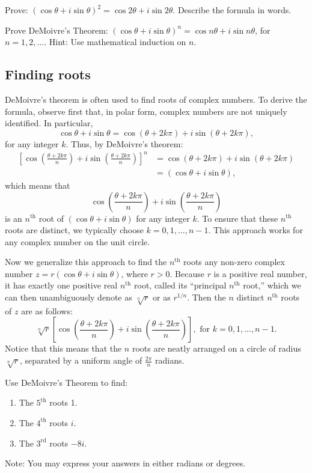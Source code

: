 \documentclass[handout,space,nooutcomes]{ximera}
\begin{document}
\begin{problem}
Prove:  $(\cos\theta + i\sin\theta)^2=\cos 2\theta + i\sin 2\theta$.  Describe the formula in words.    
\end{problem}

\begin{problem}
Prove DeMoivre's Theorem:  $(\cos\theta + i\sin\theta)^n=\cos n\theta + i\sin n\theta$, for $n=1, 2, \dots$.  Hint: Use mathematical induction on $n$. 
\end{problem}

\subsection*{Finding roots}
DeMoivre's theorem is often used to find roots of complex numbers.  
To derive the formula, observe first that, in polar form, complex numbers are not uniquely identified.  In particular, 
\[
\cos\theta + i\sin\theta =\cos (\theta+2k\pi) + i\sin (\theta+2k\pi), 
\]
for any integer $k$. Thus, by DeMoivre's theorem:  
\begin{align*}
\left[ \cos \left(\frac{\theta+2k\pi}{n}\right) 
+ i\sin \left(\frac{\theta+2k\pi}{n}\right) \right]^n 
&= \cos (\theta+2k\pi) + i\sin (\theta+2k\pi) \\
&= (\cos\theta + i\sin\theta), 
\end{align*}
which means that 
\[
\cos \left(\frac{\theta+2k\pi}{n}\right) 
+ i\sin \left(\frac{\theta+2k\pi}{n}\right)
\]
is an $n^\text{th}$ root of $(\cos\theta + i\sin\theta)$ for any integer $k$.  To ensure that these $n^\text{th}$ roots are distinct, we typically choose $k= 0, 1, \dots, n-1$.  This approach works for any complex number on the unit circle.  

Now we generalize this approach to find the $n^\text{th}$ roots any non-zero complex number $z=r(\cos\theta + i\sin\theta)$, where $r>0$.  Because $r$ is a positive real number, it has exactly one positive real $n^\text{th}$ root, called its ``principal $n^\text{th}$ root,'' which we can then unambiguously denote as $\sqrt[n]{r}$ or as $r^{1/n}$.  Then the $n$ distinct $n^\text{th}$ roots of $z$ are as follows: 
\[
\sqrt[n]{r}\left[\cos \left(\frac{\theta+2k\pi}{n}\right) 
+ i\sin \left(\frac{\theta+2k\pi}{n}\right)\right], \text{ for } k= 0, 1, \dots, n-1. 
\]
Notice that this means that the $n$ roots are neatly arranged on a circle of radius 
$\sqrt[n]{r}$, separated by a uniform angle of $\frac{2\pi}{n}$ radians.  

\begin{problem}
Use DeMoivre's Theorem to find: 
\begin{enumerate}
\item The $5^\text{th}$ roots 1.  
\item The $4^\text{th}$ roots $i$.  
\item The $3^\text{rd}$ roots $-8i$.  
\end{enumerate}
Note: You may express your answers in either radians or degrees.  
\end{problem}
\end{document}
